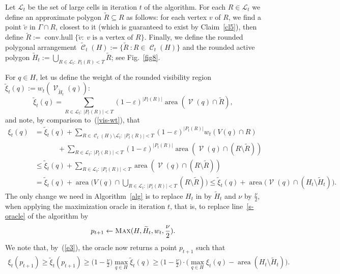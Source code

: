 \documentclass[a4paper,11pt]{article}
\def\cC{\mathcal C}
\def\cL{\mathcal L}
\def\cV{\mathcal V}
\def\eps{\varepsilon}
\newcommand{\raf}[1]{(\ref{#1})}
\newcommand{\conv}{\operatorname{conv.hull}}
\newcommand{\area}{\operatorname{area}}
\newcommand{\cells}{\operatorname{\cC}}
\newcommand{\Vis}{\operatorname{\cV}}
\def \MO {\textsc{Max}}
\begin{document}
Let $\cL_t$ be the set of large cells in iteration $t$ of the algorithm. For each $R\in\cL_t$ we define an approximate polygon $\widetilde R\subseteq R$ as follows: for each vertex $v$ of $R$, we find a point $\widetilde v$ in $\Gamma\cap R$, closest to it (which is guaranteed to exist by Claim~\ref{cl5}), then define $\widetilde R:=\conv\{\widetilde v:~v \text{ is a vertex of $R$}\}$. Finally, we define the rounded polygonal arrangement $\widetilde{\cells}_t(H):=\{\widetilde R~:R\in\cells_t(H)\}$ and the rounded active polygon $\widetilde H_t:=\bigcup_{R\in\cL_t:~P_t(R)<T}\widetilde R$; see Fig.~\ref{fig8}.  

For $q\in H$, let us define the weight of the rounded visibility region $\widetilde\xi_t(q):=w_t(\Vis_{\widetilde H_t}(q))$:
\begin{equation}\label{vis-wt3}                                                                                                 
\widetilde\xi_t(q)=\sum_{R\in \cL_t:~|P_t(R)|<T}(1-\eps)^{|P_t(R)|}\area(\Vis(q)\cap\widetilde R),
\end{equation}
and note, by comparison to~\raf{vis-wt}, that 
\begin{align}\label{e3}
\xi_t(q)&=\widetilde\xi_t(q)+\sum_{R\in\cells_t(H)\setminus\cL_t:~|P_t(R)|<T}(1-\eps)^{|P_t(R)|}w_t(V(q)\cap R)\nonumber\nonumber\\
&\qquad~\quad+\sum_{R\in\cL_t:~|P_t(R)|<T}(1-\eps)^{|P_t(R)|}\area(\Vis(q)\cap (R\setminus\widetilde R))\nonumber\\
&\le\widetilde\xi_t(q)+\sum_{R\in\cL_t:~|P_t(R)|<T}\area(\Vis(q)\cap (R\setminus\widetilde R))\nonumber\\&=\widetilde\xi_t(q)+\area\Big(V(q)\cap\bigcup_{R\in\cL_t:~|P_t(R)|<T}(R\setminus\widetilde R)\Big)\le\widetilde\xi_t(q)+\area\Big(\Vis(q)\cap(H_t\setminus\widetilde H_t)\Big).
\end{align}
The only change we need in Algorithm~\ref{alg} is to replace $H_t$ in  by $\widetilde{H}_t$ and $\nu$ by $\frac\nu{2}$, when applying the maximization oracle in iteration $t$, that is, to replace line~\ref{s-oracle} of the algorithm by $$p_{t+1}\gets\MO(H,\widetilde H_t,w_t,\frac{\nu}{2}).$$ 
We note that, by~\raf{e3}, the oracle now returns a point $p_{t+1}$ such that
\begin{align}\label{e4}
\xi_t(p_{t+1})\ge\widetilde\xi_t(p_{t+1})\ge\Big(1-\frac\nu2\Big)\max_{q\in H}\widetilde\xi_t(q)\ge\Big(1-\frac\nu2\Big)\cdot\Big(\max_{q\in H}\xi_t(q)-\area(H_t\setminus\widetilde H_t)\Big).
\end{align}
\end{document}
